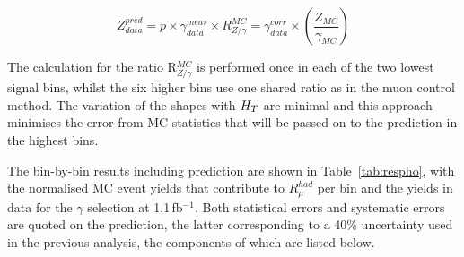 \begin{equation}
Z^{pred}_{data} = p \times \gamma^{meas}_{data}\times R^{MC}_{Z/\gamma} = \gamma^{corr}_{data}\times (\frac{Z_{MC}}{\gamma_{MC}})
\label{eq:phopred}
\end{equation}

The calculation for the ratio R$^{MC}_{Z/\gamma}$ is performed once in each of the two lowest signal bins, whilst the six higher bins use one shared ratio as in the muon control method. The variation of the shapes with $H_{T}$ are minimal and this approach minimises the error from MC statistics that will be passed on to the prediction in the highest bins.

The bin-by-bin results including prediction are shown in Table~\ref{tab:respho}, with the normalised MC event yields that contribute to $R^{had}_{\mu}$ per bin and the yields in data for the $\gamma$ selection at 1.1\,fb$^{-1}$. Both statistical errors and systematic errors are quoted on the prediction, the latter corresponding to a 40\% uncertainty used in the previous analysis, the components of which are listed below.

